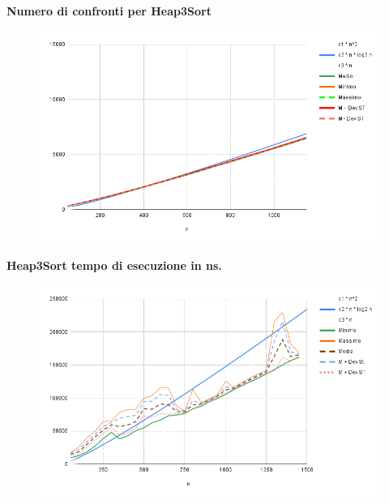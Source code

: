 \documentclass{article}
\begin{document}
 \vspace*{2.4 cm}
\begin{center}
    \Large \textbf{Numero di confronti per Heap3Sort}
    \begin{figure}[h]
        \centering
        \includegraphics[width=0.97\linewidth]{Grafici/Heap3SortConf.png}
        \label{fig:graph}
    \end{figure}
\end{center}


\newpage
\vspace*{-2.9 cm}
\begin{center}
    \Large \textbf{Heap3Sort tempo di esecuzione in ns.}
    \begin{figure}[h]
        \centering
        \includegraphics[width=0.95\linewidth]{Grafici/Heap3SortTempNs.png}
        \label{fig:graph}
    \end{figure}
\end{center}
\end{document}
